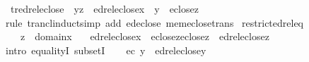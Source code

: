 \begin{isabellebody}
\endisatagproof
{\isafoldproof}%
%
\isadelimproof
\isanewline
%
\endisadelimproof
\isanewline
{}\isamarkupfalse%
\ tr{\isacharunderscore}{\kern0pt}edrel{\isacharunderscore}{\kern0pt}eclose\ {\isacharcolon}{\kern0pt}\ {\isachardoublequoteopen}{\isasymlangle}y{\isacharcomma}{\kern0pt}z{\isasymrangle}\ {\isasymin}\ edrel{\isacharparenleft}{\kern0pt}eclose{\isacharparenleft}{\kern0pt}{\isacharbraceleft}{\kern0pt}x{\isacharbraceright}{\kern0pt}{\isacharparenright}{\kern0pt}{\isacharparenright}{\kern0pt}{\isacharcircum}{\kern0pt}{\isacharplus}{\kern0pt}\ {\isasymLongrightarrow}\ y\ {\isasymin}\ eclose{\isacharparenleft}{\kern0pt}z{\isacharparenright}{\kern0pt}{\isachardoublequoteclose}\isanewline
%
\isadelimproof
\ \ %
\endisadelimproof
%
\isatagproof
{}\isamarkupfalse%
{\isacharparenleft}{\kern0pt}rule\ trancl{\isacharunderscore}{\kern0pt}induct{\isacharcomma}{\kern0pt}{\isacharparenleft}{\kern0pt}simp\ add{\isacharcolon}{\kern0pt}\ ed{\isacharunderscore}{\kern0pt}eclose\ mem{\isacharunderscore}{\kern0pt}eclose{\isacharunderscore}{\kern0pt}trans{\isacharparenright}{\kern0pt}{\isacharplus}{\kern0pt}{\isacharparenright}{\kern0pt}%
\endisatagproof
{\isafoldproof}%
%
\isadelimproof
\isanewline
%
\endisadelimproof
\isanewline
\isanewline
{}\isamarkupfalse%
\ restrict{\isacharunderscore}{\kern0pt}edrel{\isacharunderscore}{\kern0pt}eq\ {\isacharcolon}{\kern0pt}\isanewline
\ \ \ {\isachardoublequoteopen}z\ {\isasymin}\ domain{\isacharparenleft}{\kern0pt}x{\isacharparenright}{\kern0pt}{\isachardoublequoteclose}\isanewline
\ \ \ {\isachardoublequoteopen}edrel{\isacharparenleft}{\kern0pt}eclose{\isacharparenleft}{\kern0pt}{\isacharbraceleft}{\kern0pt}x{\isacharbraceright}{\kern0pt}{\isacharparenright}{\kern0pt}{\isacharparenright}{\kern0pt}\ {\isasyminter}\ eclose{\isacharparenleft}{\kern0pt}{\isacharbraceleft}{\kern0pt}z{\isacharbraceright}{\kern0pt}{\isacharparenright}{\kern0pt}{\isasymtimes}eclose{\isacharparenleft}{\kern0pt}{\isacharbraceleft}{\kern0pt}z{\isacharbraceright}{\kern0pt}{\isacharparenright}{\kern0pt}\ {\isacharequal}{\kern0pt}\ edrel{\isacharparenleft}{\kern0pt}eclose{\isacharparenleft}{\kern0pt}{\isacharbraceleft}{\kern0pt}z{\isacharbraceright}{\kern0pt}{\isacharparenright}{\kern0pt}{\isacharparenright}{\kern0pt}{\isachardoublequoteclose}\isanewline
%
\isadelimproof
%
\endisadelimproof
%
\isatagproof
{}\isamarkupfalse%
{\isacharparenleft}{\kern0pt}intro\ equalityI\ subsetI{\isacharparenright}{\kern0pt}\isanewline
\ \ \isamarkupfalse%
\ {\isacharquery}{\kern0pt}ec{\isacharequal}{\kern0pt}{\isachardoublequoteopen}{\isasymlambda}\ y\ {\isachardot}{\kern0pt}\ edrel{\isacharparenleft}{\kern0pt}eclose{\isacharparenleft}{\kern0pt}{\isacharbraceleft}{\kern0pt}y{\isacharbraceright}{\kern0pt}{\isacharparenright}{\kern0pt}{\isacharparenright}{\kern0pt}{\isachardoublequoteclose}\isanewline

\end{isabellebody}
